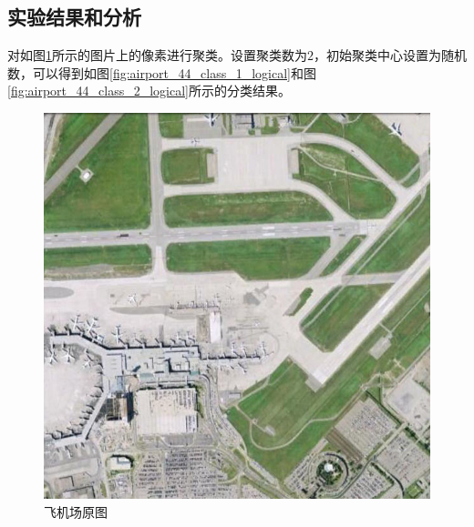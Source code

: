 \subsection{实验结果和分析}
对如图\ref{fig:airport_44}所示的图片上的像素进行聚类。设置聚类数为$2$，初始聚类中心设置为随机数，可以得到如图\ref{fig:airport_44_class_1_logical}和图\ref{fig:airport_44_class_2_logical}所示的分类结果。
\begin{figure}[H]
	\centering
	\includegraphics[width=0.7\linewidth]{figure/airport_44.jpg}
	\caption{飞机场原图}
	\label{fig:airport_44}
\end{figure}

